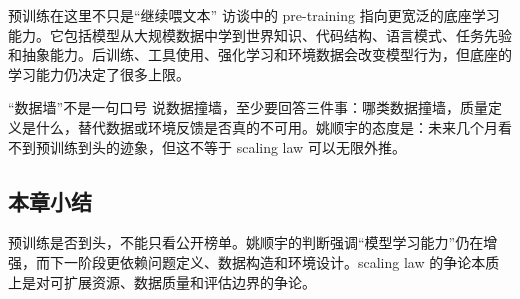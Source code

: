 \begin{knowledgebox}{预训练在这里不只是“继续喂文本”}
访谈中的 pre-training 指向更宽泛的底座学习能力。它包括模型从大规模数据中学到世界知识、代码结构、语言模式、任务先验和抽象能力。后训练、工具使用、强化学习和环境数据会改变模型行为，但底座的学习能力仍决定了很多上限。
\end{knowledgebox}

\begin{warningbox}{“数据墙”不是一句口号}
说数据撞墙，至少要回答三件事：哪类数据撞墙，质量定义是什么，替代数据或环境反馈是否真的不可用。姚顺宇的态度是：未来几个月看不到预训练到头的迹象，但这不等于 scaling law 可以无限外推。
\end{warningbox}

\subsection{本章小结}

预训练是否到头，不能只看公开榜单。姚顺宇的判断强调“模型学习能力”仍在增强，而下一阶段更依赖问题定义、数据构造和环境设计。scaling law 的争论本质上是对可扩展资源、数据质量和评估边界的争论。

